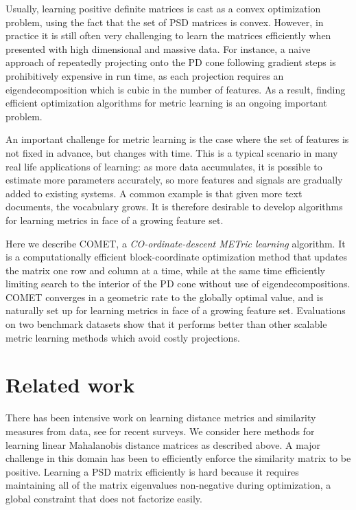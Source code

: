 \documentclass{article}
\begin{document}
Usually, learning positive definite matrices is cast as a convex optimization problem, using the fact that the set of PSD matrices is convex. However, in practice it is still often very challenging to learn the matrices efficiently when presented with high dimensional and massive data. For instance, a naive approach of repeatedly projecting onto the PD cone following gradient steps is prohibitively expensive in run time, as each projection requires an eigendecomposition which is cubic in the number of features. As a result, finding efficient optimization algorithms for metric learning is an ongoing important problem.

An important challenge for metric learning is the case where the set of features is not fixed in advance, but changes with time. This is a typical scenario in many real life applications of learning: as more data accumulates, it is possible to estimate more parameters accurately, so more features and signals are gradually added to existing systems. A common example is that given more text documents, the vocabulary grows. It is therefore desirable to develop algorithms for learning metrics in face of a growing feature set. 

Here we describe COMET, a {\em{CO-ordinate-descent METric learning}} algorithm. It is a computationally efficient block-coordinate optimization method that updates the matrix one row and column at a time, while at the same time efficiently limiting search to the interior of the PD cone without use of eigendecompositions. COMET converges in a geometric rate to the globally optimal value, and is naturally set up for learning metrics in face of a growing feature set. Evaluations on two benchmark datasets show that it performs better than other scalable metric learning methods which avoid costly projections. 



\section{Related work}
There has been intensive work on learning distance metrics and similarity measures from data, see \citet{bellet2013survey, kulis2012survey} for recent surveys. We consider here methods for learning linear Mahalanobis distance matrices as described above. A major challenge in this domain has been to efficiently enforce the similarity matrix to be positive. Learning a PSD matrix efficiently is hard because it requires maintaining all of the matrix eigenvalues non-negative during optimization, a global constraint that does not factorize easily.
\end{document}
